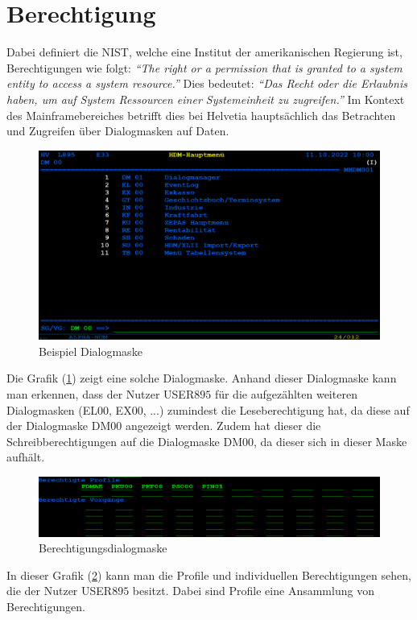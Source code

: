 \section{Berechtigung}
\label{sec:Berechtigung}
Dabei definiert die \ac{NIST}, welche eine Institut der amerikanischen Regierung ist, Berechtigungen wie folgt:
\newline
\newline
\textit{"`The right or a permission that is granted to a system entity to access a system resource."'} \cite{Auth}
\newline
\newline
Dies bedeutet:
\newline
\newline
\textit{"`Das Recht oder die Erlaubnis haben, um auf System Ressourcen einer Systemeinheit zu zugreifen."'} \cite{Mainframe}
\newline
\newline
Im Kontext des Mainframebereiches betrifft dies bei Helvetia hauptsächlich das Betrachten und Zugreifen über Dialogmasken auf Daten.
\begin{figure}[h!]
 \centering
 \includegraphics[width=1\textwidth]{gfx/Picture/Dialog.PNG}
 \caption{Beispiel Dialogmaske}
 \label{fig:Dial}
\end{figure}
Die Grafik (\ref{fig:Dial}) zeigt eine solche Dialogmaske.
Anhand dieser Dialogmaske kann man erkennen, dass der Nutzer USER$895$ für die aufgezählten weiteren Dialogmasken (EL$00$, EX$00$, ...) zumindest die Leseberechtigung hat, da diese auf der Dialogmaske DM$00$ angezeigt werden.
Zudem hat dieser die Schreibberechtigungen auf die Dialogmaske DM$00$, da dieser sich in dieser Maske aufhält. 
\newline
\newline
\begin{figure}[h!]
 \centering
 \includegraphics[width=1\textwidth]{gfx/Picture/Berechtigung.PNG}
 \caption{Berechtigungsdialogmaske}
 \label{fig:Berch}
\end{figure}
In dieser Grafik (\ref{fig:Berch}) kann man die Profile und individuellen Berechtigungen sehen, die der Nutzer USER$895$ besitzt.
Dabei sind Profile eine Ansammlung von Berechtigungen.

